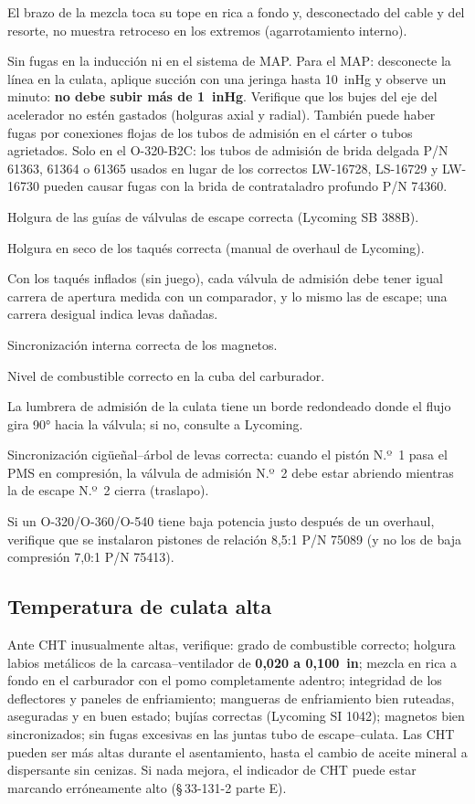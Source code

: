 \begin{pasos}
\item El brazo de la mezcla toca su tope en rica a fondo y, desconectado del cable y del resorte, no muestra retroceso en los extremos (agarrotamiento interno).
\item Sin fugas en la inducción ni en el sistema de MAP. Para el MAP: desconecte la línea en la culata, aplique succión con una jeringa hasta 10~inHg y observe un minuto: \textbf{no debe subir más de 1~inHg}. Verifique que los bujes del eje del acelerador no estén gastados (holguras axial y radial). También puede haber fugas por conexiones flojas de los tubos de admisión en el cárter o tubos agrietados. Solo en el O-320-B2C: los tubos de admisión de brida delgada P/N 61363, 61364 o 61365 usados en lugar de los correctos LW-16728, LS-16729 y LW-16730 pueden causar fugas con la brida de contrataladro profundo P/N 74360.
\item Holgura de las guías de válvulas de escape correcta (Lycoming SB 388B).
\item Holgura en seco de los taqués correcta (manual de overhaul de Lycoming).
\item Con los taqués inflados (sin juego), cada válvula de admisión debe tener igual carrera de apertura medida con un comparador, y lo mismo las de escape; una carrera desigual indica levas dañadas.
\item Sincronización interna correcta de los magnetos.
\item Nivel de combustible correcto en la cuba del carburador.
\item La lumbrera de admisión de la culata tiene un borde redondeado donde el flujo gira 90° hacia la válvula; si no, consulte a Lycoming.
\item Sincronización cigüeñal--árbol de levas correcta: cuando el pistón N.º~1 pasa el PMS en compresión, la válvula de admisión N.º~2 debe estar abriendo mientras la de escape N.º~2 cierra (traslapo).
\item Si un O-320/O-360/O-540 tiene baja potencia justo después de un overhaul, verifique que se instalaron pistones de relación 8,5:1 P/N 75089 (y no los de baja compresión 7,0:1 P/N 75413).
\end{pasos}

\subsection{Temperatura de culata alta}

Ante CHT inusualmente altas, verifique: grado de combustible correcto; holgura labios metálicos de la carcasa--ventilador de \textbf{0,020 a 0,100~in}; mezcla en rica a fondo en el carburador con el pomo completamente adentro; integridad de los deflectores y paneles de enfriamiento; mangueras de enfriamiento bien ruteadas, aseguradas y en buen estado; bujías correctas (Lycoming SI 1042); magnetos bien sincronizados; sin fugas excesivas en las juntas tubo de escape--culata. Las CHT pueden ser más altas durante el asentamiento, hasta el cambio de aceite mineral a dispersante sin cenizas. Si nada mejora, el indicador de CHT puede estar marcando erróneamente alto (\S\,33-131-2 parte E).

